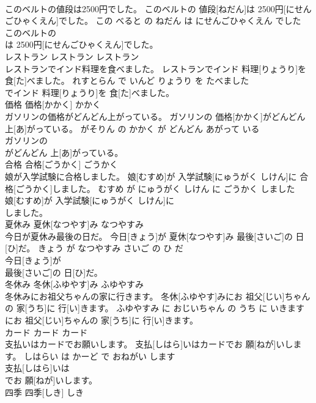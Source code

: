 \documentclass[8pt]{extreport}
\begin{document}
\begin{CJK}{UTF8}{min}
\\	このベルトの値段は2500円でした。	このベルトの 値段[ねだん]は 2500円[にせんごひゃくえん]でした。	この べると の ねだん は にせんごひゃくえん でした	
\\	このベルトの
\\	は 2500円[にせんごひゃくえん]でした。		
\\	レストラン	レストラン	レストラン	
\\	レストランでインド料理を食べました。	レストランでインド 料理[りょうり]を 食[た]べました。	れすとらん で いんど りょうり を たべました	
\\	でインド 料理[りょうり]を 食[た]べました。		
\\	価格	価格[かかく]	かかく	
\\	ガソリンの価格がどんどん上がっている。	ガソリンの 価格[かかく]がどんどん 上[あ]がっている。	がそりん の かかく が どんどん あがって いる	
\\	ガソリンの
\\	がどんどん 上[あ]がっている。		
\\	合格	合格[ごうかく]	ごうかく	
\\	娘が入学試験に合格しました。	娘[むすめ]が 入学試験[にゅうがく しけん]に 合格[ごうかく]しました。	むすめ が にゅうがく しけん に ごうかく しました	
\\	娘[むすめ]が 入学試験[にゅうがく しけん]に
\\	しました。		
\\	夏休み	夏休[なつやす]み	なつやすみ	
\\	今日が夏休み最後の日だ。	今日[きょう]が 夏休[なつやす]み 最後[さいご]の 日[ひ]だ。	きょう が なつやすみ さいご の ひ だ	
\\	今日[きょう]が
\\	最後[さいご]の 日[ひ]だ。		
\\	冬休み	冬休[ふゆやす]み	ふゆやすみ	
\\	冬休みにお祖父ちゃんの家に行きます。	冬休[ふゆやす]みにお 祖父[じい]ちゃんの 家[うち]に 行[い]きます。	ふゆやすみ に おじいちゃん の うち に いきます	
\\	にお 祖父[じい]ちゃんの 家[うち]に 行[い]きます。		
\\	カード	カード	カード	
\\	支払いはカードでお願いします。	支払[しはら]いはカードでお 願[ねが]いします。	しはらい は かーど で おねがい します	
\\	支払[しはら]いは
\\	でお 願[ねが]いします。		
\\	四季	四季[しき]	しき	

\end{CJK}
\end{document}
